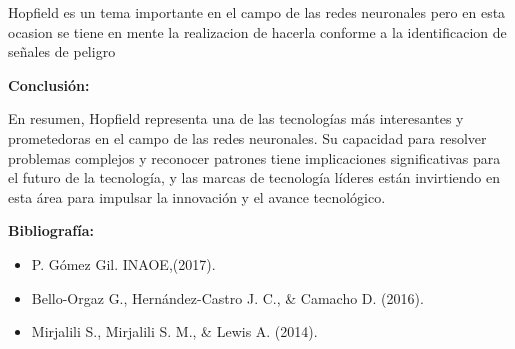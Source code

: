\documentclass{article}
\begin{document}
Hopfield es un tema importante en el campo de las redes neuronales pero en esta ocasion se tiene en mente la realizacion de hacerla conforme a la identificacion de señales de peligro



\textbf{Conclusión:}

En resumen, Hopfield representa una de las tecnologías más interesantes y prometedoras en el campo de las redes neuronales. Su capacidad para resolver problemas complejos y reconocer patrones tiene implicaciones significativas para el futuro de la tecnología, y las marcas de tecnología líderes están invirtiendo en esta área para impulsar la innovación y el avance tecnológico.



\textbf{Bibliografía:}
\begin{itemize}
    \item P. Gómez Gil. INAOE,(2017).
    \item Bello-Orgaz G., Hernández-Castro J. C., & Camacho D. (2016).
    \item Mirjalili S., Mirjalili S. M., & Lewis A. (2014).
\end{itemize}
\end{document}
